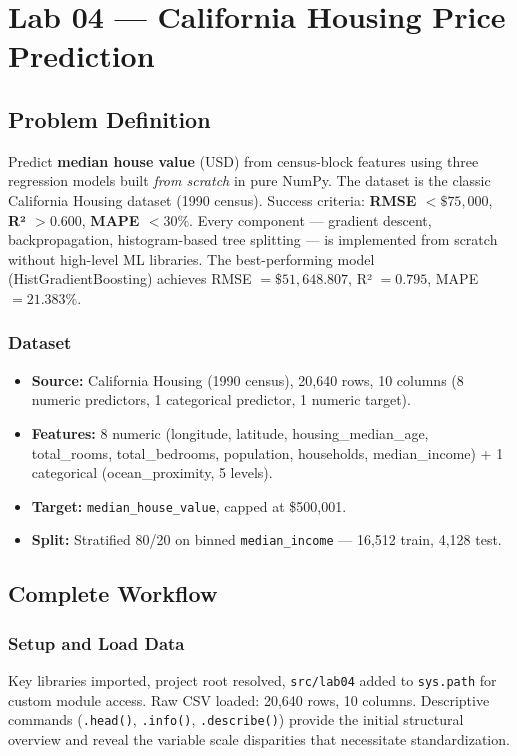 \chapter{Lab 04 — California Housing Price Prediction}
\label{ch:lab04}

\section{Problem Definition}

\begin{problembox}
Predict \textbf{median house value} (USD) from census-block features using three regression models built \textit{from scratch} in pure NumPy. The dataset is the classic California Housing dataset (1990 census). Success criteria: \textbf{RMSE $< \$75{,}000$}, \textbf{R² $> 0.600$}, \textbf{MAPE $< 30\%$}. Every component — gradient descent, backpropagation, histogram-based tree splitting — is implemented from scratch without high-level ML libraries. The best-performing model (HistGradientBoosting) achieves RMSE $= \$51{,}648.807$, R² $= 0.795$, MAPE $= 21.383\%$.
\end{problembox}

\subsection{Dataset}
\begin{itemize}
  \item \textbf{Source:} California Housing (1990 census), 20,640 rows, 10 columns (8 numeric predictors, 1 categorical predictor, 1 numeric target).
  \item \textbf{Features:} 8 numeric (longitude, latitude, housing\_median\_age, total\_rooms, total\_bedrooms, population, households, median\_income) + 1 categorical (ocean\_proximity, 5 levels).
  \item \textbf{Target:} \texttt{median\_house\_value}, capped at \$500,001.
  \item \textbf{Split:} Stratified 80/20 on binned \texttt{median\_income} — 16,512 train, 4,128 test.
\end{itemize}

\section{Complete Workflow}

\subsection{Setup and Load Data}
Key libraries imported, project root resolved, \texttt{src/lab04} added to \texttt{sys.path} for custom module access. Raw CSV loaded: 20,640 rows, 10 columns. Descriptive commands (\texttt{.head()}, \texttt{.info()}, \texttt{.describe()}) provide the initial structural overview and reveal the variable scale disparities that necessitate standardization.

